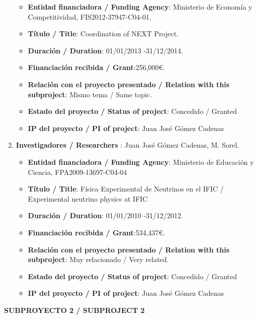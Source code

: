 \begin{enumerate}
\begin{itemize}
\item {\bf Entidad financiadora / Funding Agency}:  Ministerio de Econom\'ia y Competitividad, FIS2012-37947-C04-01.
\item {\bf Título / Title}:  Coordination of NEXT Project.
\item {\bf Duración / Duration}: 01/01/2013 -31/12/2014. 
\item {\bf Financiación recibida / Grant}:256,000\euro. 
\item {\bf Relación con el proyecto presentado / Relation with this subproject}: Mismo tema / Same topic. 
\item {\bf Estado del proyecto / Status of project}: Concedido / Granted
\item {\bf IP del proyecto / PI of project}: Juan José Gómez Cadenas 
\end{itemize}
\item {\bf Investigadores / Researchers }: Juan José Gómez Cadenas, M. Sorel.
\begin{itemize}
\item {\bf Entidad financiadora / Funding Agency}:  Ministerio de Educaci\'on y Ciencia, FPA2009-13697-C04-04
\item {\bf Título / Title}:  Física Experimental de Neutrinos en el IFIC / Experimental neutrino physics at IFIC
\item {\bf Duración / Duration}: 01/01/2010 -31/12/2012. 
\item {\bf Financiación recibida / Grant}:534,437\euro. 
\item {\bf Relación con el proyecto presentado / Relation with this subproject}: Muy relacionado / Very related. 
\item {\bf Estado del proyecto / Status of project}: Concedido / Granted
\item {\bf IP del proyecto / PI of project}: Juan José Gómez Cadenas 
\end{itemize}
\end{enumerate}

\vspace{12pt}

\noindent\textbf{SUBPROYECTO 2 / SUBPROJECT 2}

